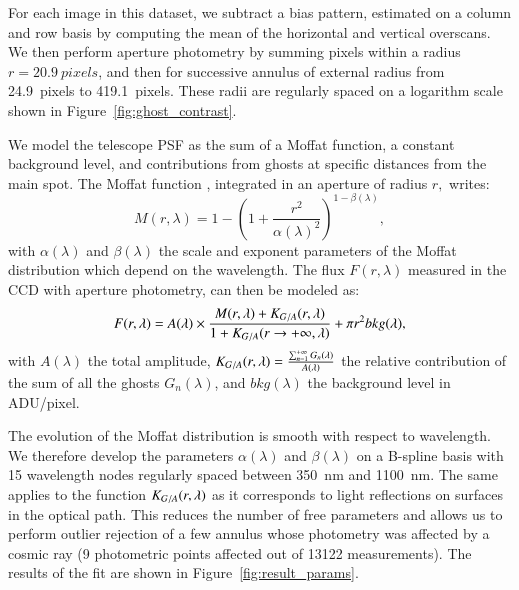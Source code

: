 For each image in this dataset, we subtract a bias pattern, estimated on a column and row basis by computing the mean of the horizontal and vertical overscans. We then perform aperture photometry by summing pixels within a radius $r=\SI{20.9}{pixels}$, and then for successive annulus of external radius from \SI{24.9}{pixels} to \SI{419.1}{pixels}. These radii are regularly spaced on a logarithm scale shown in Figure~\ref{fig:ghost_contrast}.

We model the \SD telescope PSF as the sum of a Moffat function, a constant background level, and contributions from ghosts at specific distances from the main spot. The Moffat function \citep{moffat}, integrated in an aperture of radius $r,$ writes:
\begin{equation}
M(r, \lambda)= 1 - \left( 1+\frac{r^2}{\alpha(\lambda)^2} \right)^{1-\beta(\lambda)},
\end{equation}
with $\alpha(\lambda)$ and $\beta(\lambda)$ the scale and exponent parameters of the Moffat distribution which depend on the wavelength. The flux $F(r, \lambda)$ measured in the CCD with aperture photometry, can then be modeled as: 
\begin{equation}
F(r, \lambda) = A(\lambda) \times \frac{M(r, \lambda) + K_{G/A}(r, \lambda)}{1 + K_{G/A}(r \rightarrow +\infty, \lambda)} + \pi r^2 bkg(\lambda),
\label{eq:moffat_model}
\end{equation}
with $A(\lambda)$ the total amplitude, $K_{G/A}(r, \lambda) = \frac{\sum_{n=1}^{+\infty} G_n(\lambda)}{A(\lambda)}$ the relative contribution of the sum of all the ghosts $G_n(\lambda)$, and $bkg(\lambda)$ the background level in ADU/pixel. 

The evolution of the Moffat distribution is smooth with respect to wavelength. We therefore develop the parameters $\alpha(\lambda)$ and $\beta(\lambda)$  on a B-spline basis with 15 wavelength nodes regularly spaced between \SI{350}{\nano\meter} and \SI{1100}{\nano\meter}. The same applies to the function $K_{G/A}(r, \lambda)$ as it corresponds to light reflections on surfaces in the optical path. This reduces the number of free parameters and allows us to perform outlier rejection of a few annulus whose photometry was affected by a cosmic ray (9 photometric points affected out of 13122 measurements). The results of the fit are shown in Figure~\ref{fig:result_params}. 

